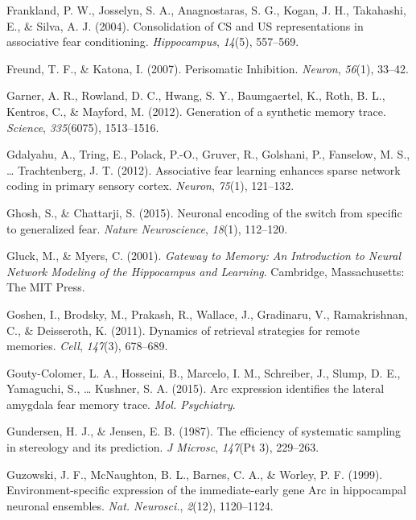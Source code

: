 \documentclass[12pt,a4paper,]{report}
\begin{document}
\hypertarget{ref-franklandux5fconsolidationux5f2004-1}{}
Frankland, P. W., Josselyn, S. A., Anagnostaras, S. G., Kogan, J. H.,
Takahashi, E., \& Silva, A. J. (2004). Consolidation of CS and US
representations in associative fear conditioning. \emph{Hippocampus},
\emph{14}(5), 557--569.

\hypertarget{ref-freundux5fperisomaticux5f2007}{}
Freund, T. F., \& Katona, I. (2007). Perisomatic Inhibition.
\emph{Neuron}, \emph{56}(1), 33--42.

\hypertarget{ref-garnerux5fgenerationux5f2012-2}{}
Garner, A. R., Rowland, D. C., Hwang, S. Y., Baumgaertel, K., Roth, B.
L., Kentros, C., \& Mayford, M. (2012). Generation of a synthetic memory
trace. \emph{Science}, \emph{335}(6075), 1513--1516.

\hypertarget{ref-gdalyahuux5fassociativeux5f2012}{}
Gdalyahu, A., Tring, E., Polack, P.-O., Gruver, R., Golshani, P.,
Fanselow, M. S., \ldots{} Trachtenberg, J. T. (2012). Associative fear
learning enhances sparse network coding in primary sensory cortex.
\emph{Neuron}, \emph{75}(1), 121--132.

\hypertarget{ref-ghoshux5fneuronalux5f2015}{}
Ghosh, S., \& Chattarji, S. (2015). Neuronal encoding of the switch from
specific to generalized fear. \emph{Nature Neuroscience}, \emph{18}(1),
112--120.

\hypertarget{ref-gluckux5fgatewayux5f2001}{}
Gluck, M., \& Myers, C. (2001). \emph{Gateway to Memory: An Introduction
to Neural Network Modeling of the Hippocampus and Learning}. Cambridge,
Massachusetts: The MIT Press.

\hypertarget{ref-goshenux5fdynamicsux5f2011}{}
Goshen, I., Brodsky, M., Prakash, R., Wallace, J., Gradinaru, V.,
Ramakrishnan, C., \& Deisseroth, K. (2011). Dynamics of retrieval
strategies for remote memories. \emph{Cell}, \emph{147}(3), 678--689.

\hypertarget{ref-gouty-colomerux5farcux5f2015}{}
Gouty-Colomer, L. A., Hosseini, B., Marcelo, I. M., Schreiber, J.,
Slump, D. E., Yamaguchi, S., \ldots{} Kushner, S. A. (2015). Arc
expression identifies the lateral amygdala fear memory trace. \emph{Mol.
Psychiatry}.

\hypertarget{ref-gundersenux5fefficiencyux5f1987}{}
Gundersen, H. J., \& Jensen, E. B. (1987). The efficiency of systematic
sampling in stereology and its prediction. \emph{J Microsc},
\emph{147}(Pt 3), 229--263.

\hypertarget{ref-guzowskiux5fenvironment-specificux5f1999-1}{}
Guzowski, J. F., McNaughton, B. L., Barnes, C. A., \& Worley, P. F.
(1999). Environment-specific expression of the immediate-early gene Arc
in hippocampal neuronal ensembles. \emph{Nat. Neurosci.}, \emph{2}(12),
1120--1124.
\end{document}
